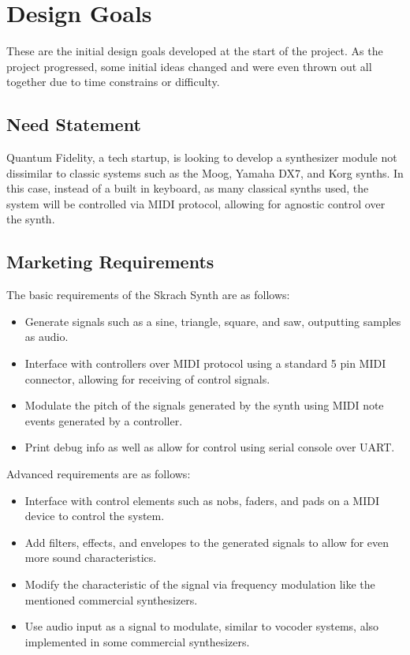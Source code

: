 \documentclass[12pt]{article}
\begin{document}
\section{Design Goals}

These are the initial design goals developed at the start of the project. As the project progressed, some initial ideas changed and were even thrown out all together due to time constrains or difficulty.

\subsection{Need Statement}

Quantum Fidelity, a tech startup, is looking to develop a synthesizer module not dissimilar to classic systems such as the Moog, Yamaha DX7, and Korg synths. In this case, instead of a built in keyboard, as many classical synths used, the system will be controlled via MIDI protocol, allowing for agnostic control over the synth.

\subsection{Marketing Requirements}

The basic requirements of the Skrach Synth are as follows:

\begin{itemize}
    \item Generate signals such as a sine, triangle, square, and saw, outputting samples as audio.
    \item Interface with controllers over MIDI protocol using a standard 5 pin MIDI connector, allowing for receiving of control signals.
    \item Modulate the pitch of the signals generated by the synth using MIDI note events generated by a controller.
    \item Print debug info as well as allow for control using serial console over UART.
\end{itemize}

\noindent Advanced requirements are as follows:

\begin{itemize}
    \item Interface with control elements such as nobs, faders, and pads on a MIDI device to control the system.
    \item Add filters, effects, and envelopes to the generated signals to allow for even more sound characteristics.
    \item Modify the characteristic of the signal via frequency modulation like the mentioned commercial synthesizers.
    \item Use audio input as a signal to modulate, similar to vocoder systems, also implemented in some commercial synthesizers.
\end{itemize}
\end{document}
